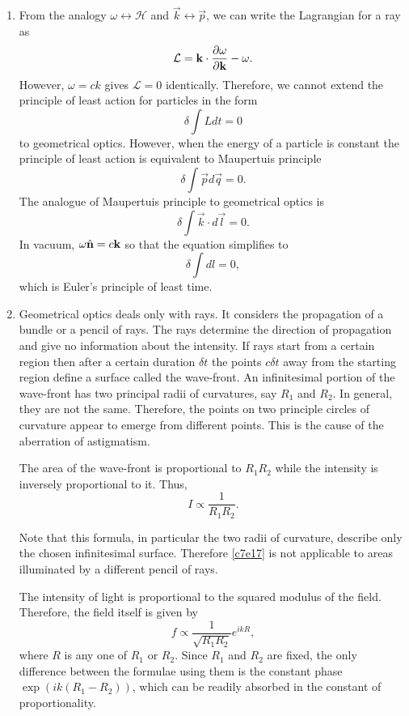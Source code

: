 \begin{enumerate}
\item From the analogy $\omega \leftrightarrow \mathcal{H}$ and $\vec{k} 
\leftrightarrow \vec{p}$, we can write the Lagrangian for a ray as
\[
\mathcal{L} = \mathbf{k}\cdot\frac{\partial{\omega}}{\partial{\mathbf{k}}} - \omega.
\]
However, $\omega = ck$ gives $\mathcal{L} = 0$ identically. Therefore, we cannot
extend the principle of least action for particles in the form
\[
\delta\int Ldt = 0
\]
to geometrical optics. However, when the energy of a particle is constant the
principle of least action is equivalent to Maupertuis principle
\[
\delta\int\vec{p}d\vec{q} = 0.
\]
The analogue of Maupertuis principle to geometrical optics is
\begin{equation}\label{c7e15}
\delta\int\vec{k}\cdot d\vec{l} = 0.
\end{equation}
In vacuum, $\omega\hat{\mathbf{n}} = c\mathbf{k}$ so that the equation simplifies to
\begin{equation}\label{c7e16}
\delta\int dl = 0,
\end{equation}
which is Euler's principle of least time.

\item Geometrical optics deals only with rays. It considers the propagation of a
bundle or a pencil of rays. The rays determine the direction of propagation and 
give no information about the intensity. If rays start from a certain region then
after a certain duration $\delta t$ the points $c\delta t$ away from the starting
region define a surface called the wave-front. An infinitesimal portion of the
wave-front has two principal radii of curvatures, say $R_1$ and $R_2$. In general,
they are not the same. Therefore, the points on two principle circles of curvature
appear to emerge from different points. This is the cause of the aberration of
astigmatism.

The area of the wave-front is proportional to $R_1R_2$ while the intensity is
inversely proportional to it. Thus,
\begin{equation}\label{c7e17}
I \propto \frac{1}{R_1R_2}.
\end{equation}

Note that this formula, in particular the two radii of curvature, describe only 
the chosen infinitesimal surface. Therefore \eqref{c7e17} is not applicable to
areas illuminated by a different pencil of rays.

The intensity of light is proportional to the squared modulus of the field.
Therefore, the field itself is given by
\begin{equation}\label{c7e18}
f \propto \frac{1}{\sqrt{R_1R_2}} e^{ikR},
\end{equation}
where $R$ is any one of $R_1$ or $R_2$. Since $R_1$ and $R_2$ are fixed, the only
difference between the formulae using them is the constant phase $\exp(ik(R_1-R_2))$,
which can be readily absorbed in the constant of proportionality.


\end{enumerate}

